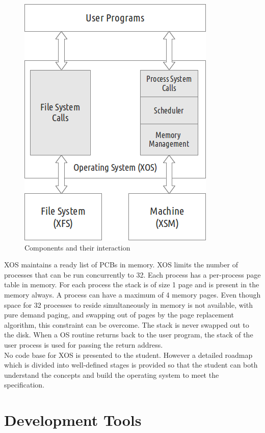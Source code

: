 \documentclass{sig-alternate}
\begin{document}
\begin{figure}[hbtp]
\centering
\includegraphics[scale=0.59]{xosstructure.png}
\caption{Components and their interaction}
\end{figure}

\vspace{1in}
XOS maintains a ready list of PCBs in memory. XOS limits the number of processes that can be run concurrently to 32. Each process has a per-process page table in memory. For each process the stack is of size 1 page and is present in the memory always. A process can have a maximum of 4 memory pages. Even though space for 32 processes to reside simultaneously in memory is not available, with pure demand paging, and swapping out of pages by the page replacement algorithm, this constraint can be overcome. The stack is never swapped out to the disk. When a OS routine returns back to the user program,  the stack of the user process is used for passing the return address. \\

No code base for XOS is presented to the student. However a detailed roadmap which is divided into well-defined stages is provided so that the student can both understand the concepts and build the operating system to meet the specification.




\section{Development Tools}
\end{document}
